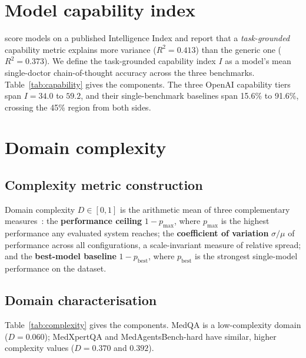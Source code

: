 \appendix

\renewcommand{\dblfloatpagefraction}{0.9}
\section{Model capability index}
\label{app:capability}

\citet{kim2026scaling} score models on a published Intelligence Index and report that a
\emph{task-grounded} capability metric explains more variance ($R^2 = 0.413$) than the generic one
($R^2 = 0.373$). We define the task-grounded capability index $I$ as a model's mean
single-doctor chain-of-thought accuracy across the three benchmarks. Table~\ref{tab:capability}
gives the components. The three OpenAI capability tiers span $I = 34.0$ to $59.2$, and their single-benchmark
baselines span 15.6\% to 91.6\%, crossing the 45\% region from both sides.

\begin{table}[t]\centering\small
\caption{\textbf{Capability index.} Entries are single-doctor CoT accuracies (\%); bold $I$ is their mean across benchmarks. The final column gives model settings.}
\label{tab:capability}

\end{table}

\section{Domain complexity}
\label{app:complexity}

\subsection{Complexity metric construction}
Domain complexity $D \in [0,1]$ is the arithmetic mean of three complementary
measures~\citep{kim2026scaling}: the \textbf{performance ceiling} $1 - p_{\max}$, where $p_{\max}$ is the
highest performance any evaluated system reaches; the \textbf{coefficient of variation}
$\sigma/\mu$ of performance across all configurations, a scale-invariant measure of relative
spread; and the \textbf{best-model baseline} $1 - p_{\text{best}}$, where $p_{\text{best}}$ is the
strongest single-model performance on the dataset.

\subsection{Domain characterisation}
Table~\ref{tab:complexity} gives the components. MedQA is a low-complexity domain ($D = 0.060$);
MedXpertQA and MedAgentsBench-hard have similar, higher complexity values
($D = 0.370$ and $0.392$).

